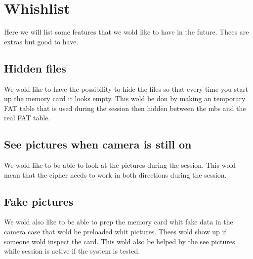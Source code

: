 \documentclass[]{article}
\begin{document}


\section{Whishlist}
Here we will list some features that we wold like to have in the future.
Thees are extras but good to have.

\subsection{Hidden files}
We wold like to have the possibility to hide the files so that every time you start up the memory card it looks empty.
This wold be don by making an temporary FAT table that is used during the session then hidden between the \gls{mbs} and the real FAT table.

\subsection{See pictures when camera is still on}
We wold like to be able to look at the pictures during the session.
This wold mean that the cipher needs to work in both directions during the session.

\subsection{Fake pictures}
We wold also like to be able to prep the memory card whit fake data in the camera case that wold be preloaded whit pictures.
Thees wold show up if someone wold inspect the card.
This wold also be helped by the see pictures while session is active if the system is tested.




\clearpage
\newpage
\printglossary[type=\acronymtype]
\printnoidxglossaries


{}

\end{document}
